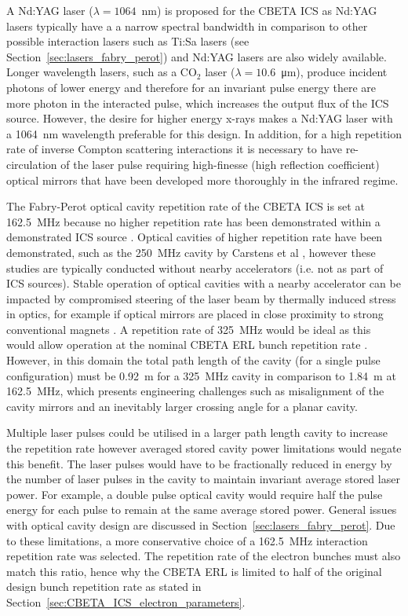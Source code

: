 \documentclass[../main.tex]{subfiles}
\begin{document}
A Nd:YAG laser ($\lambda = 1064$~\si{\nano\meter}) is proposed for the CBETA ICS as Nd:YAG lasers typically have a a narrow spectral bandwidth in comparison to other possible interaction lasers such as Ti:Sa lasers (see Section~\ref{sec:lasers_fabry_perot}) and Nd:YAG lasers are also widely available. Longer wavelength lasers, such as a CO$_{2}$ laser \cite{pogorelsky2020converting} ($\lambda = 10.6$~\si{\micro\meter}), produce incident photons of lower energy and therefore for an invariant pulse energy there are more photon in the interacted pulse, which increases the output flux of the ICS source. However, the desire for higher energy x-rays makes a Nd:YAG laser with a 1064~\si{\nano\meter} wavelength preferable for this design. In addition, for a high repetition rate of inverse Compton scattering interactions it is necessary to have re-circulation of the laser pulse requiring high-finesse (high reflection coefficient) optical mirrors that have been developed more thoroughly in the infrared regime. 

The Fabry-Perot optical cavity repetition rate of the CBETA ICS is set at 162.5~\si{\mega\hertz} because no higher repetition rate has been demonstrated within a demonstrated ICS source \cite{akagi2016narrow}. Optical cavities of higher repetition rate have been demonstrated, such as the 250~\si{\mega\hertz} cavity by Carstens et al \cite{carstens2014megawatt}, however these studies are typically conducted without nearby accelerators (i.e. not as part of ICS sources). Stable operation of optical cavities with a nearby accelerator can be impacted by compromised steering of the laser beam by thermally induced
stress in optics, for example if optical mirrors are placed in close proximity to strong conventional magnets \cite{gunther2019device}. A repetition rate of 325~\si{\mega\hertz} would be ideal as this would allow operation at the nominal CBETA ERL bunch repetition rate \cite{hoffstaetter2017cbeta}. However, in this domain the total path length of the cavity (for a single pulse configuration) must be 0.92~\si{\meter} for a 325~\si{\mega\hertz} cavity in comparison to 1.84~\si{\meter} at 162.5~\si{\mega\hertz}, which presents engineering challenges such as misalignment of the cavity mirrors and an inevitably larger crossing angle for a planar cavity.

Multiple laser pulses could be utilised in a larger path length cavity to increase the repetition rate however averaged stored cavity power limitations would negate this benefit. The laser pulses would have to be fractionally reduced in energy by the number of laser pulses in the cavity to maintain invariant average stored laser power. For example, a double pulse optical cavity would require half the pulse energy for each pulse to remain at the same average stored power. General issues with optical cavity design are discussed in Section~\ref{sec:lasers_fabry_perot}. Due to these limitations, a more conservative choice of a 162.5~\si{\mega\hertz} interaction repetition rate was selected. The repetition rate of the electron bunches must also match this ratio, hence why the CBETA ERL is limited to half of the original design bunch repetition rate as stated in Section~\ref{sec:CBETA_ICS_electron_parameters}. 
\end{document}
